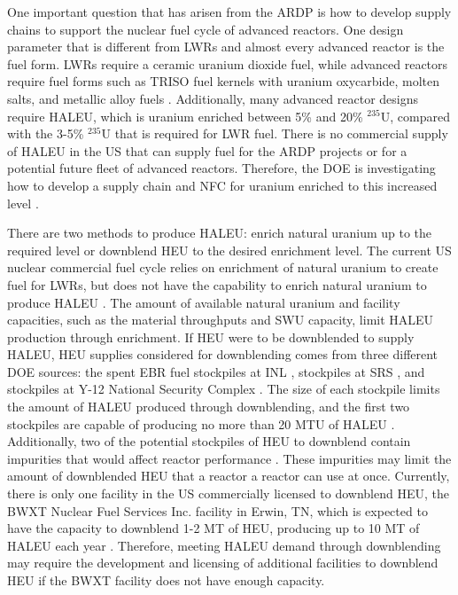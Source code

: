 One important question that has arisen from the \gls{ARDP} is how to
develop supply chains to support the nuclear fuel cycle of 
advanced reactors. One design parameter that is different from \glspl{LWR} 
and almost every advanced reactor is the fuel form. \glspl{LWR} require 
a ceramic uranium dioxide fuel, while advanced reactors require fuel 
forms such as \gls{TRISO} fuel kernels with uranium oxycarbide, molten 
salts, and metallic alloy fuels \cite{hussain_advances_2018}.
Additionally, many advanced reactor designs require  
\acrfull{HALEU}, which is uranium enriched between 5\% and 20\% $^{235}$U,
compared with the 3-5\% $^{235}$U that is required for \gls{LWR} 
fuel. There is no commercial supply of \gls{HALEU} in the US that can 
supply fuel for the \gls{ARDP} projects or for a potential future fleet of 
advanced reactors. Therefore, the \gls{DOE} is investigating how to develop 
a supply chain and \gls{NFC} for uranium enriched to this 
increased level \cite{regalbuto_addressing_2020,dixon_estimated_2022}. 

There are two methods to produce \gls{HALEU}: enrich natural uranium up to 
the required level
or downblend \acrfull{HEU} to the desired enrichment level. The current US
nuclear commercial fuel cycle relies on enrichment of natural uranium 
to create fuel for \glspl{LWR}, but does not have the capability to enrich
natural uranium to produce \gls{HALEU} \cite{nuclear_energy_institute_addressing_2018}.  
The amount of available natural uranium and facility capacities, such 
as the material throughputs and \acrfull{SWU} capacity, limit 
\gls{HALEU} production through enrichment. If \gls{HEU} were to be 
downblended to supply \gls{HALEU}, \gls{HEU} supplies
considered for downblending comes from three different 
\gls{DOE} sources: the spent \gls{EBR} fuel stockpiles at \gls{INL} 
\cite{patterson_haleu_2019}, stockpiles at \gls{SRS} \cite{regalbuto_addressing_2020}, 
and stockpiles at Y-12 National Security Complex 
\cite{robinson_establishment_2020}. The size of each stockpile limits the amount 
of \gls{HALEU} produced through downblending, and the first two stockpiles 
are capable of producing no more than 20 MTU of \gls{HALEU}
\cite{regalbuto_addressing_2020}.
Additionally, two of the potential stockpiles of \gls{HEU} to downblend  
contain impurities that would affect reactor performance 
\cite{vaden_isotopic_2018,nelson_foreign_2010}.
These impurities may limit the amount of downblended \gls{HEU} that a reactor 
a reactor can use at once. 
Currently, there is only one facility in the US commercially licensed to 
downblend \gls{HEU}, the BWXT Nuclear Fuel Services Inc. facility in 
Erwin, TN, which is expected to have the capacity to downblend 1-2 
MT of \gls{HEU}, producing up to 10 MT of \gls{HALEU} each year \cite{nagley_ha-leu_2020}.
Therefore, meeting \gls{HALEU} demand through downblending may require the 
development and licensing of additional facilities to downblend \gls{HEU} if 
the BWXT facility does not have enough capacity. 

